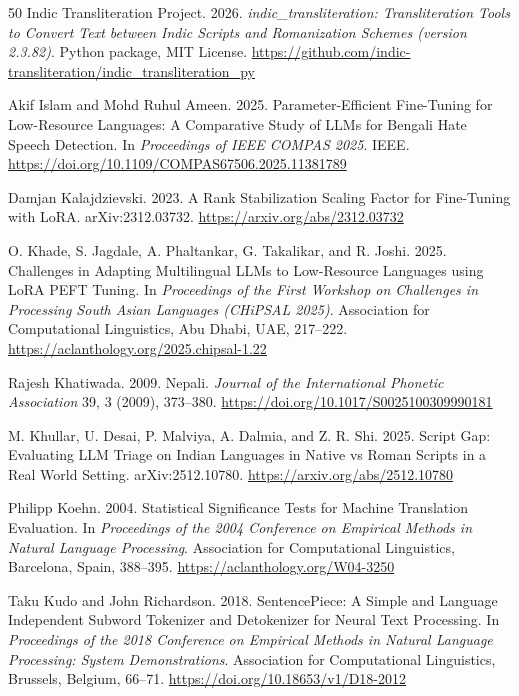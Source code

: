 \documentclass{article}
\begin{document}
\begin{thebibliography}{50}
Indic Transliteration Project. 2026. \emph{indic\_transliteration: Transliteration Tools to Convert Text between Indic Scripts and Romanization Schemes (version 2.3.82)}. Python package, MIT License. \url{https://github.com/indic-transliteration/indic_transliteration_py}

Akif Islam and Mohd Ruhul Ameen. 2025. Parameter-Efficient Fine-Tuning for Low-Resource Languages: A Comparative Study of LLMs for Bengali Hate Speech Detection. In \emph{Proceedings of IEEE COMPAS 2025}. IEEE. \url{https://doi.org/10.1109/COMPAS67506.2025.11381789}

Damjan Kalajdzievski. 2023. A Rank Stabilization Scaling Factor for Fine-Tuning with LoRA. arXiv:2312.03732. \url{https://arxiv.org/abs/2312.03732}

O. Khade, S. Jagdale, A. Phaltankar, G. Takalikar, and R. Joshi. 2025. Challenges in Adapting Multilingual LLMs to Low-Resource Languages using LoRA PEFT Tuning. In \emph{Proceedings of the First Workshop on Challenges in Processing South Asian Languages (CHiPSAL 2025)}. Association for Computational Linguistics, Abu Dhabi, UAE, 217–222. \url{https://aclanthology.org/2025.chipsal-1.22}

Rajesh Khatiwada. 2009. Nepali. \emph{Journal of the International Phonetic Association} 39, 3 (2009), 373–380. \url{https://doi.org/10.1017/S0025100309990181}

M. Khullar, U. Desai, P. Malviya, A. Dalmia, and Z. R. Shi. 2025. Script Gap: Evaluating LLM Triage on Indian Languages in Native vs Roman Scripts in a Real World Setting. arXiv:2512.10780. \url{https://arxiv.org/abs/2512.10780}

Philipp Koehn. 2004. Statistical Significance Tests for Machine Translation Evaluation. In \emph{Proceedings of the 2004 Conference on Empirical Methods in Natural Language Processing}. Association for Computational Linguistics, Barcelona, Spain, 388–395. \url{https://aclanthology.org/W04-3250}

Taku Kudo and John Richardson. 2018. SentencePiece: A Simple and Language Independent Subword Tokenizer and Detokenizer for Neural Text Processing. In \emph{Proceedings of the 2018 Conference on Empirical Methods in Natural Language Processing: System Demonstrations}. Association for Computational Linguistics, Brussels, Belgium, 66–71. \url{https://doi.org/10.18653/v1/D18-2012}


\end{thebibliography}
\end{document}
